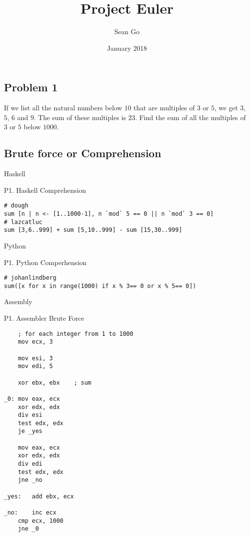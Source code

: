 \documentclass[12pt, a4page, oneside]{article}
\title{Project Euler}
\author{Sean Go}
\date{January 2018}
\begin{document}
\begin{CJK*}{UTF8}{gbsn}

\maketitle

\section{Problem 1}
If we list all the natural numbers below $10$ that are multiples of $3$ or $5$, we get $3$, $5$, $6$ and $9$. The sum of these multiples is $23$. Find the sum of all the multiples of $3$ or $5$ below $1000$.
\subsection{Brute force or Comprehension}
Haskell
\begin{listing}[ht]
\caption{P1. Haskell Comprehension}
\begin{verbatim}
# dough
sum [n | n <- [1..1000-1], n `mod` 5 == 0 || n `mod` 3 == 0]
# lazcatluc
sum [3,6..999] + sum [5,10..999] - sum [15,30..999] 
\end{verbatim}
\end{listing}

\par\noindent
Python  
\begin{listing}[ht]
\caption{P1. Python Comperhension}
\begin{verbatim}
# johanlindberg
sum([x for x in range(1000) if x % 3== 0 or x % 5== 0])
\end{verbatim}
\end{listing}


\newpage
Assembly
\begin{listing}[ht]
\caption{P1. Assembler Brute Force}
\begin{verbatim}
	; for each integer from 1 to 1000
	mov ecx, 3

	mov esi, 3
	mov edi, 5

	xor ebx, ebx	; sum

_0:	mov eax, ecx
	xor edx, edx
	div esi
	test edx, edx
	je _yes

	mov eax, ecx
	xor edx, edx
	div edi
	test edx, edx
	jne _no

_yes:	add ebx, ecx

_no:	inc ecx
	cmp ecx, 1000
	jne _0
\end{verbatim}
\end{listing}


\end{CJK*}
\end{document}
